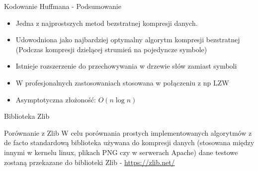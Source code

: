 \documentclass[aspectratio=169]{beamer}
\begin{document}
        \begin{frame}{Kodowanie Huffmana - Podsumowanie}
            \begin{itemize}
                \item Jedna z najprostszych metod bezstratnej kompresji danych.
                \item Udowodniona jako najbardziej optymalny algorytm kompresji bezstratnej (Podczas kompresji dzielącej strumień na pojedyncze symbole)
                \item Istnieje rozszerzenie do przechowywania w drzewie słów zamiast symboli
                \item W profesjonalnych zastosowaniach stosowana w połączeniu z np LZW
                \item Asymptotyczna złożoność: $O(n\log{n})$
            \end{itemize}
        \end{frame}

    \begin{frame}[plain,c]
        \begin{center}
            \Large Biblioteka Zlib
        \end{center}
    \end{frame}
    
    
    \begin{frame}{Porównanie z Zlib}
        W celu porównania prostych implementowanych algorytmów z de facto standardową biblioteka używana do kompresji danych (stosowana między innymi w kernelu linux, plikach PNG czy w serwerach Apache) dane testowe zostaną przekazane do biblioteki Zlib - \url{https://zlib.net/}
    \end{frame}
    
\end{document}
